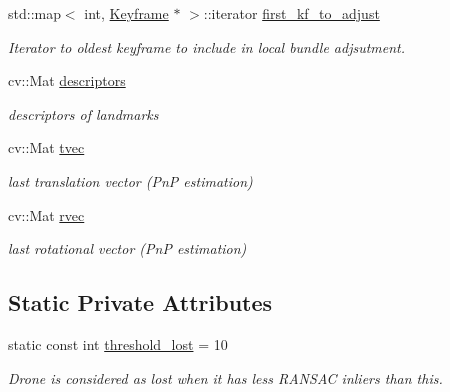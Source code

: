 \begin{DoxyCompactItemize}
std\+::map$<$ int, \hyperlink{classKeyframe}{Keyframe} $\ast$ $>$\+::iterator \hyperlink{classMap_a54b766b2b43d23be965610d9c5ca16f2}{first\+\_\+kf\+\_\+to\+\_\+adjust}
\begin{DoxyCompactList}\small\item\em Iterator to oldest keyframe to include in local bundle adjsutment. \end{DoxyCompactList}\item 
\mbox{\label{classMap_a28b528d6d4769cec76f32a66251faf4c}} 
cv\+::\+Mat \hyperlink{classMap_a28b528d6d4769cec76f32a66251faf4c}{descriptors}
\begin{DoxyCompactList}\small\item\em descriptors of landmarks \end{DoxyCompactList}\item 
\mbox{\label{classMap_aed26fe7354f99268588ebbcdd1718ba2}} 
cv\+::\+Mat \hyperlink{classMap_aed26fe7354f99268588ebbcdd1718ba2}{tvec}
\begin{DoxyCompactList}\small\item\em last translation vector (PnP estimation) \end{DoxyCompactList}\item 
\mbox{\label{classMap_a361dde7c4a9710f4d228bb32b7a596d7}} 
cv\+::\+Mat \hyperlink{classMap_a361dde7c4a9710f4d228bb32b7a596d7}{rvec}
\begin{DoxyCompactList}\small\item\em last rotational vector (PnP estimation) \end{DoxyCompactList}\end{DoxyCompactItemize}
\subsection*{Static Private Attributes}
\begin{DoxyCompactItemize}
\item 
\mbox{\label{classMap_a688d93e7daa5dacfdcf68041fc0ce683}} 
static const int \hyperlink{classMap_a688d93e7daa5dacfdcf68041fc0ce683}{threshold\+\_\+lost} = 10
\begin{DoxyCompactList}\small\item\em Drone is considered as lost when it has less R\+A\+N\+S\+AC inliers than this. \end{DoxyCompactList}\end{DoxyCompactItemize}


